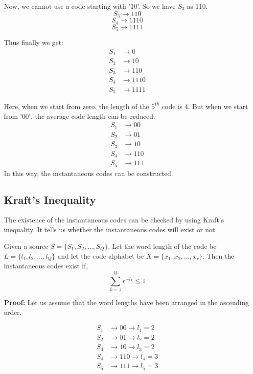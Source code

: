 \documentclass[12pt]{article}
\begin{document}
Now, we cannot use a code starting with '10'. So we have $S_3$ as 110.
$$S_3 \rightarrow 110$$
$$S_4 \rightarrow 1110$$
$$S_5 \rightarrow 1111$$

Thus finally we get:
\begin{align*}
	S_1 & \rightarrow 0    \\
	S_2 & \rightarrow 10   \\
	S_3 & \rightarrow 110  \\
	S_4 & \rightarrow 1110 \\
	S_5 & \rightarrow 1111
\end{align*}

Here, when we start from zero, the length of the $5^{th}$ code is 4. But when we start from '00', the average code length can be reduced.
\begin{align*}
	S_1 & \rightarrow 00  \\
	S_2 & \rightarrow 01  \\
	S_3 & \rightarrow 10  \\
	S_4 & \rightarrow 110 \\
	S_5 & \rightarrow 111
\end{align*}
In this way, the instantaneous codes can be constructed.

\subsection{Kraft's Inequality}
The existence of the instantaneous codes can be checked by using Kraft's inequality. It tells us whether the instantaneous codes will exist or not.

Given a source $S=\{S_1, S_2, \ldots, S_Q\}$. Let the word length of the code be $L=\{l_1, l_2, \ldots, l_Q\}$ and let the code alphabet be $X=\{x_1, x_2, \ldots, x_r\}$. Then the instantaneous codes exist if,
$$\sum_{k=1}^{Q} r^{-l_k} \le 1$$

\textbf{Proof:}
Let us assume that the word lengths have been arranged in the ascending order.

\begin{align*}
	S_1 & \rightarrow 00 \rightarrow l_1 = 2  \\
	S_2 & \rightarrow 01 \rightarrow l_2 = 2  \\
	S_3 & \rightarrow 10 \rightarrow l_3 = 2  \\
	S_4 & \rightarrow 110 \rightarrow l_4 = 3 \\
	S_5 & \rightarrow 111 \rightarrow l_5 = 3
\end{align*}
\end{document}
